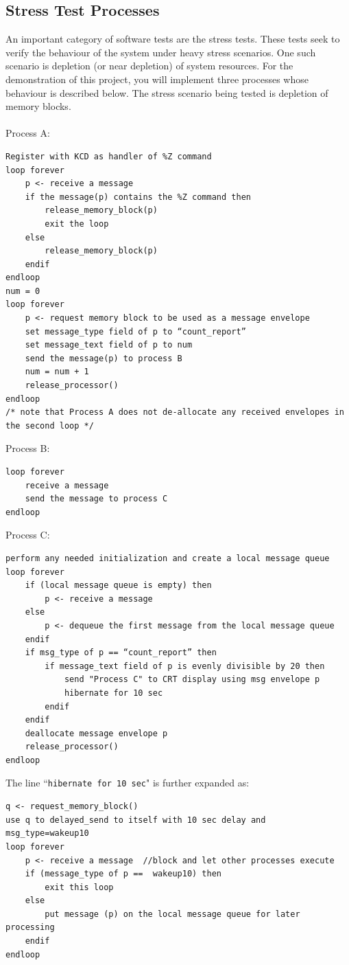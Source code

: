 \subsection{Stress Test Processes}
\label{subsec_abc_procs}
An important category of software tests are the stress tests. These tests seek to verify the behaviour of the system under heavy stress scenarios. One such scenario is depletion (or near depletion) of system resources. For the demonstration of this project, you will implement three processes whose behaviour is described below. The stress scenario being tested is depletion of memory blocks. \\ \\
Process A: 
\begin{lstlisting}
Register with KCD as handler of %Z command
loop forever
	p <- receive a message
	if the message(p) contains the %Z command then 
		release_memory_block(p)
		exit the loop
	else
		release_memory_block(p)
	endif
endloop
num = 0
loop forever
	p <- request memory block to be used as a message envelope
	set message_type field of p to “count_report”
	set message_text field of p to num 
	send the message(p) to process B
	num = num + 1
	release_processor()
endloop
/* note that Process A does not de-allocate any received envelopes in the second loop */
\end{lstlisting}
Process B:
\begin{lstlisting}
loop forever
	receive a message
	send the message to process C
endloop
\end{lstlisting}
Process C:
\begin{lstlisting}
perform any needed initialization and create a local message queue
loop forever
	if (local message queue is empty) then
		p <- receive a message
	else 
		p <- dequeue the first message from the local message queue
	endif
	if msg_type of p == “count_report” then
		if message_text field of p is evenly divisible by 20 then
			send "Process C" to CRT display using msg envelope p
			hibernate for 10 sec
		endif
	endif
	deallocate message envelope p
	release_processor()
endloop
\end{lstlisting}
The line ``\verb+hibernate for 10 sec+" is further expanded as:
\begin{lstlisting}	
q <- request_memory_block()
use q to delayed_send to itself with 10 sec delay and msg_type=wakeup10
loop forever
	p <- receive a message	//block and let other processes execute
	if (message_type of p ==  wakeup10) then
		exit this loop
	else 
		put message (p) on the local message queue for later processing
	endif
endloop
\end{lstlisting}
